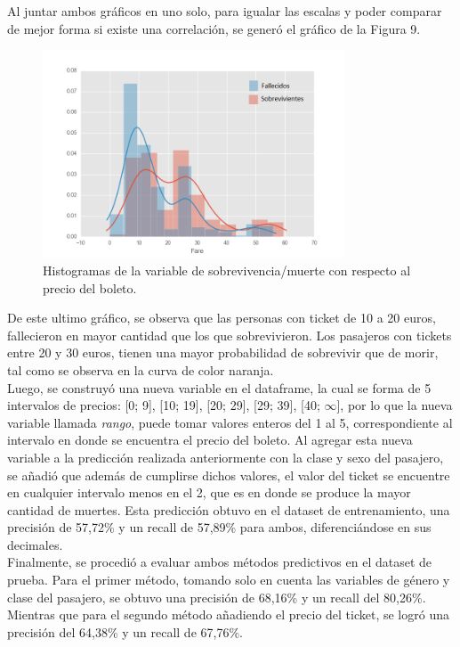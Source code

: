 \documentclass[letter, 10pt]{article}
\begin{document}
Al juntar ambos gráficos en uno solo, para igualar las escalas y poder comparar de mejor forma si existe una correlación, se generó el gráfico de la Figura 9.

\begin{figure}[H]
\begin{center}
\includegraphics[width=0.8\textwidth]{Images/figure_12.png}
\caption{Histogramas de la variable de sobrevivencia/muerte con respecto al precio del boleto.}
\end{center}
\end{figure}

De este ultimo gráfico, se observa que las personas con ticket de 10 a 20 euros, fallecieron en mayor cantidad que los que sobrevivieron. Los pasajeros con tickets entre 20 y 30 euros, tienen una mayor probabilidad de sobrevivir que de morir, tal como se observa en la curva de color naranja.\\

Luego, se construyó una nueva variable en el dataframe, la cual se forma de 5 intervalos de precios: [0; 9], [10; 19], [20; 29], [29; 39], [40; $\infty$], por lo que la nueva variable llamada \textit{rango}, puede tomar valores enteros del 1 al 5, correspondiente al intervalo en donde se encuentra el precio del boleto. Al agregar esta nueva variable a la predicción realizada anteriormente con la clase y sexo del pasajero, se añadió que además de cumplirse dichos valores, el valor del ticket se encuentre en cualquier intervalo menos en el 2, que es en donde se produce la mayor cantidad de muertes. Esta predicción obtuvo en el dataset de entrenamiento, una precisión de 57,72\% y un recall de 57,89\% para ambos, diferenciándose en sus decimales.\\

Finalmente, se procedió a evaluar ambos métodos predictivos en el dataset de prueba. Para el primer método, tomando solo en cuenta las variables de género y clase del pasajero, se obtuvo una precisión de 68,16\% y un recall del 80,26\%. Mientras que para el segundo método añadiendo el precio del ticket, se logró una precisión del 64,38\% y un recall de 67,76\%.\\
\end{document}
